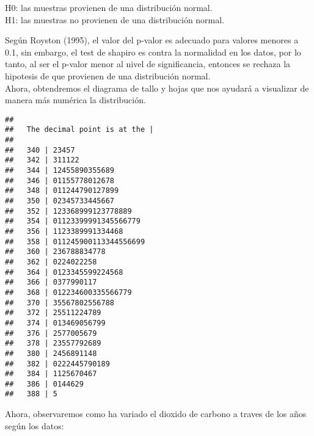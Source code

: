 \documentclass[]{article}
\newenvironment{Shaded}{\begin{snugshade}}{\end{snugshade}}
\newcommand{\KeywordTok}[1]{\textcolor[rgb]{0.13,0.29,0.53}{\textbf{#1}}}
\newcommand{\OperatorTok}[1]{\textcolor[rgb]{0.81,0.36,0.00}{\textbf{#1}}}
\newcommand{\NormalTok}[1]{#1}
\begin{document}
H0: las muestras provienen de una distribución normal.\\
H1: las muestras no provienen de una distribución normal.

Según Royston (1995), el valor del p-valor es adecuado para valores
menores a 0.1, sin embargo, el test de shapiro es contra la normalidad
en los datos, por lo tanto, al ser el p-valor menor al nivel de
significancia, entonces se rechaza la hipotesis de que provienen de una
distribución normal.\\

Ahora, obtendremos el diagrama de tallo y hojas que nos ayudará a
visualizar de manera más numérica la distribución.

\begin{Shaded}
\end{Shaded}

\begin{verbatim}
## 
##   The decimal point is at the |
## 
##   340 | 23457
##   342 | 311122
##   344 | 12455890355689
##   346 | 01155778012678
##   348 | 011244790127899
##   350 | 02345733445667
##   352 | 123368999123778889
##   354 | 01123399991345566779
##   356 | 1123389991334468
##   358 | 011245900113344556699
##   360 | 236788834778
##   362 | 0224022258
##   364 | 0123345599224568
##   366 | 0377990117
##   368 | 012234600335566779
##   370 | 35567802556788
##   372 | 25511224789
##   374 | 013469056799
##   376 | 2577005679
##   378 | 23557792689
##   380 | 2456891148
##   382 | 0222445790189
##   384 | 1125670467
##   386 | 0144629
##   388 | 5
\end{verbatim}

Ahora, observaremos como ha variado el dioxido de carbono a traves de
los años según los datos:
\end{document}
